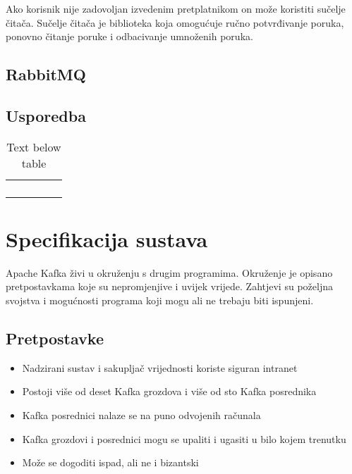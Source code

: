 \documentclass[times, utf8, diplomski, numeric]{fer}
\begin{document}
Ako korisnik nije zadovoljan izvedenim pretplatnikom on može koristiti sučelje čitača. Sučelje čitača je biblioteka koja omogućuje ručno potvrđivanje poruka, ponovno čitanje poruke i odbacivanje umnoženih poruka.

\section{RabbitMQ}

\section{Usporedba}

\begin{table}[]
\begin{tabular}{lllll}
 &  &  &  &  \\
 &  &  &  &  \\
 &  &  &  &  \\
 &  &  &  & 
\end{tabular}

\caption{Text below table}
\label{table:sample_table_label}

\end{table}

\chapter{Specifikacija sustava}

Apache Kafka živi u okruženju s drugim programima. Okruženje je opisano pretpostavkama koje su nepromjenjive i uvijek vrijede. Zahtjevi su poželjna svojstva i mogućnosti programa koji mogu ali ne trebaju biti ispunjeni.

\section{Pretpostavke}

\begin{itemize}
    \item Nadzirani sustav i sakupljač vrijednosti koriste siguran intranet
    \item Postoji više od deset Kafka grozdova i više od sto Kafka posrednika
    \item Kafka posrednici nalaze se na puno odvojenih računala
    \item Kafka grozdovi i posrednici mogu se upaliti i ugasiti u bilo kojem trenutku
    \item Može se dogoditi ispad, ali ne i bizantski
\end{itemize}
\end{document}
